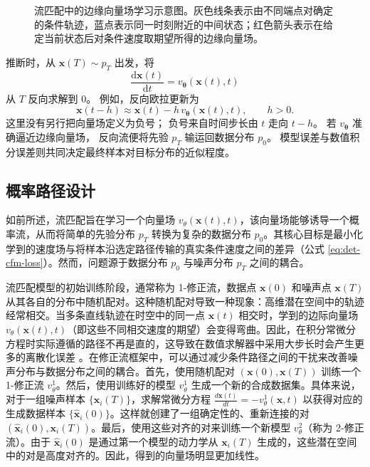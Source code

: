 \documentclass[UTF8,a4paper,zihao=-4,oneside,openany]{ctexbook}
\makeatletter
\newcommand{\AMLFigure}[2][0.96\linewidth]{%
  \begingroup
  \let\AtBeginDocument\@gobble
  \endgroup
}
\makeatother
\begin{document}
\begin{figure}[!t]
\centering
\AMLFigure{figure-marginal-vector-field}
\caption{流匹配中的边缘向量场学习示意图。灰色线条表示由不同端点对确定的条件轨迹，蓝点表示同一时刻附近的中间状态；红色箭头表示在给定当前状态后对条件速度取期望所得的边缘向量场。}
\label{fig:marginal-vector-field}
\end{figure}

推断时，从
\(\mathbf{x}(T)\sim p_T\)
出发，将
\begin{equation}
    \frac{\mathrm{d}\mathbf{x}(t)}{\mathrm{d}t}
    =
    v_{\boldsymbol{\theta}}(\mathbf{x}(t),t)
    \label{eq:det-fm-generation-ode}
\end{equation}
从 \(T\) 反向求解到 \(0\)。
例如，反向欧拉更新为
\begin{equation}
    \mathbf{x}(t-h)
    \approx
    \mathbf{x}(t)
    -
    h\,v_{\boldsymbol{\theta}}(\mathbf{x}(t),t),
    \qquad h>0.
    \label{eq:det-fm-backward-euler}
\end{equation}
这里没有另行把向量场定义为负号；
负号来自时间步长由 \(t\) 走向 \(t-h\)。
若 \(v_{\boldsymbol{\theta}}\) 准确逼近边缘向量场，
反向流便将先验 \(p_T\) 输运回数据分布 \(p_0\)。
模型误差与数值积分误差则共同决定最终样本对目标分布的近似程度。

\subsection{概率路径设计}

如前所述，流匹配旨在学习一个向量场 $v_\theta(\mathbf{x}(t), t)$，该向量场能够诱导一个概率流，从而将简单的先验分布 $p_T$ 转换为复杂的数据分布 $p_0$。其核心目标是最小化学到的速度场与将样本沿选定路径传输的真实条件速度之间的差异（公式 \ref{eq:det-cfm-loss}）。然而，问题源于数据分布 $p_0$ 与噪声分布 $p_T$ 之间的耦合。

流匹配模型的初始训练阶段，通常称为 1-修正流，数据点 $\mathbf{x}(0)$ 和噪声点 $\mathbf{x}(T)$ 从其各自的分布中随机配对。这种随机配对导致一种现象：高维潜在空间中的轨迹经常相交。当多条直线轨迹在时空中的同一点 $\mathbf{x}(t)$ 相交时，学到的边际向量场 $v_\theta(\mathbf{x}(t), t)$（即这些不同相交速度的期望）会变得弯曲。因此，在积分常微分方程时实际遵循的路径不再是直的，这导致在数值求解器中采用大步长时会产生更多的离散化误差 \citep{zhang-etal:2025:flow,yang-etal:2025text}。在修正流框架中，可以通过减少条件路径之间的干扰来改善噪声分布与数据分布之间的耦合。首先，使用随机配对 $(\mathbf{x}(0), \mathbf{x}(T))$ 训练一个 1-修正流 $v_{\theta}^1$。然后，使用训练好的模型 $v_{\theta}^1$ 生成一个新的合成数据集。具体来说，对于一组噪声样本 $\{\mathbf{x}_i(T)\}$，求解常微分方程 $\frac{d\mathbf{x}(t)}{dt} = -v_{\theta}^1(\mathbf{x}, t)$ 以获得对应的生成数据样本 $\{\hat{\mathbf{x}}_i(0)\}$。这样就创建了一组确定性的、重新连接的对 $(\hat{\mathbf{x}}_i(0), \mathbf{x}_i(T))$。最后，使用这些对齐的对来训练一个新模型 $v_{\theta}^2$（称为 2-修正流）。由于 $\hat{\mathbf{x}}_i(0)$ 是通过第一个模型的动力学从 $\mathbf{x}_i(T)$ 生成的，这些潜在空间中的对是高度对齐的。因此，得到的向量场明显更加线性。
\end{document}
